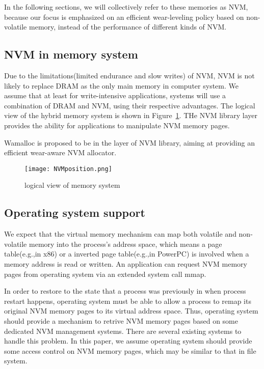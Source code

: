 \documentclass{vldb}
\begin{document}
In the following sections, we will collectively refer to these memories as NVM, 
because our focus is emphasized on an efficient wear-leveling policy based on non-volatile memory,
instead of the performance of different kinds of NVM.

\subsection{NVM in memory system}

Due to the limitations(limited endurance and slow writes) of NVM,
NVM is not likely to replace DRAM as the only main memory in computer system.
We assume that at least for write-intensive applications,
systems will use a combination of DRAM and NVM, using their respective advantages.
The logical view of the hybrid memory system is shown in Figure~\ref{fig:NVMposition}.
THe NVM library layer provides the ability for applications to manipulate NVM memory pages.

Wamalloc is proposed to be in the layer of NVM library, aiming at providing an efficient wear-aware NVM allocator.

\begin{figure}[h]
\centering
\texttt{[image: NVMposition.png]}
\caption{logical view of memory system}
\label{fig:NVMposition}
\end{figure}

\subsection{Operating system support}

We expect that the virtual memory mechanism can map both volatile and non-volatile memory into the process's address space,
which means a page table(e.g.,in x86) or a inverted page table(e.g.,in PowerPC) is involved when a memory address is read or written.
An application can request NVM memory pages from operating system via an extended system call mmap.

In order to restore to the state that a process was previously in when process restart happens, 
operating system must be able to allow a process to remap its original NVM memory pages to its virtual address space.
Thus, operating system should provide a mechanism to retrive NVM memory pages based on some dedicated NVM management systems.
There are several existing systems to handle this problem\cite{coburn2011nv, satyanarayanan1994lightweight, volos2011mnemosyne}.
In this paper, we assume operating system should provide some access control on NVM memory pages, 
which may be similar to that in file system.
\end{document}
